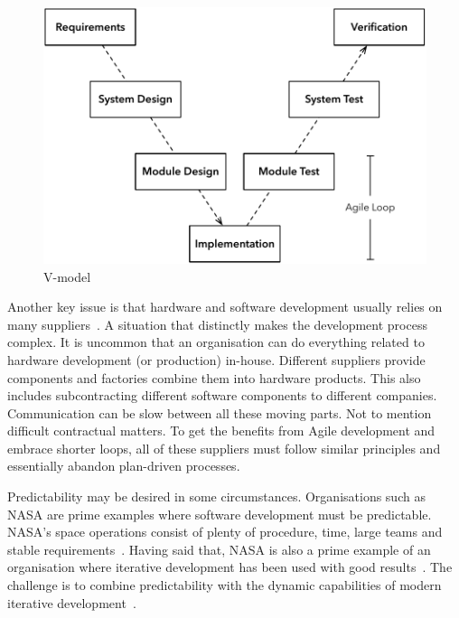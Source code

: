 \documentclass[english]{tktltiki2}
\begin{document}
\begin{figure}[h!]

    \centering
    \vspace{1cm}

    \includegraphics[scale = 0.6]{figures/v-model}

    \caption{V-model~\cite{EHS14}}
    \label{figure:v-model}

    \vspace{1cm}

\end{figure}

Another key issue is that hardware and software development usually relies on many suppliers~\cite{EB12, HAB12, EHS14}. A situation that distinctly makes the development process complex. It is uncommon that an organisation can do everything related to hardware development (or production) in-house. Different suppliers provide components and factories combine them into hardware products. This also includes subcontracting different software components to different companies. Communication can be slow between all these moving parts. Not to mention difficult contractual matters. To get the benefits from Agile development and embrace shorter loops, all of these suppliers must follow similar principles and essentially abandon plan-driven processes.

Predictability may be desired in some circumstances. Organisations such as NASA are prime examples where software development must be predictable. NASA’s space operations consist of plenty of procedure, time, large teams and stable requirements~\cite{Fow05}. Having said that, NASA is also a prime example of an organisation where iterative development has been used with good results~\cite{LB03}. The challenge is to combine predictability with the dynamic capabilities of modern iterative development~\cite{EHS14}.
\end{document}
